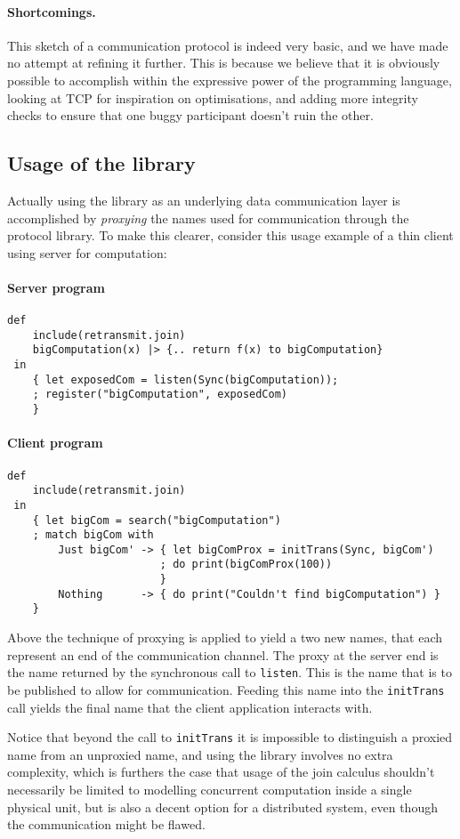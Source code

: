 \paragraph{Shortcomings.} This sketch of a communication protocol is indeed very
basic, and we have made no attempt at refining it further.  This is because we
believe that it is obviously possible to accomplish within the expressive power
of the programming language, looking at TCP for inspiration on optimisations,
and adding more integrity checks to ensure that one buggy participant doesn't
ruin the other.

\subsection{Usage of the library}

Actually using the library as an underlying data communication layer is
accomplished by \emph{proxying} the names used for communication through the
protocol library.  To make this clearer, consider this usage example of a thin
client using server for computation:

\paragraph{Server program}

\begin{verbatim}
def
    include(retransmit.join)
    bigComputation(x) |> {.. return f(x) to bigComputation}
 in
    { let exposedCom = listen(Sync(bigComputation));
    ; register("bigComputation", exposedCom)
    }
\end{verbatim}

\paragraph{Client program}

\begin{verbatim}
def
    include(retransmit.join)
 in
    { let bigCom = search("bigComputation")
    ; match bigCom with
        Just bigCom' -> { let bigComProx = initTrans(Sync, bigCom')
                        ; do print(bigComProx(100))
                        }
        Nothing      -> { do print("Couldn't find bigComputation") }
    }
\end{verbatim}

Above the technique of proxying is applied to yield a two new names,
that each represent an end of the communication channel.
The proxy at the server end is the name returned by the synchronous call to \texttt{listen}. This is the name that is to be published to allow for communication. Feeding this name into the \texttt{initTrans} call yields the final name that the client application interacts with.

Notice that beyond the call to \texttt{initTrans} it is impossible to distinguish a proxied name from an unproxied name, and using the library involves no extra complexity, which is furthers the case that usage of the join calculus shouldn't necessarily be limited to modelling concurrent computation inside a single physical unit, but is also a decent option for a distributed system, even though the communication might be flawed.
